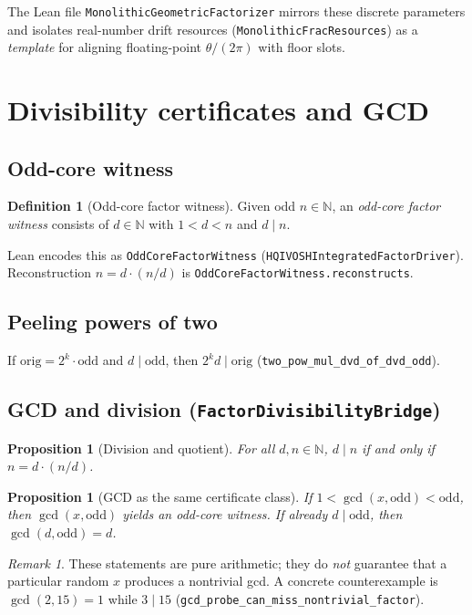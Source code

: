 \documentclass[11pt,a4paper]{article}
\newcommand{\N}{\mathbb{N}}
\theoremstyle{plain}
\newtheorem{proposition}[theorem]{Proposition}
\theoremstyle{definition}
\newtheorem{definition}[theorem]{Definition}
\theoremstyle{remark}
\newtheorem{remark}[theorem]{Remark}
\begin{document}
The Lean file \texttt{MonolithicGeometricFactorizer} mirrors these discrete parameters
and isolates real-number drift resources (\texttt{MonolithicFracResources}) as a
\emph{template} for aligning floating-point $\theta/(2\pi)$ with floor slots.

\section{Divisibility certificates and GCD}

\subsection{Odd-core witness}

\begin{definition}[Odd-core factor witness]
Given odd $n\in\N$, an \emph{odd-core factor witness} consists of $d\in\N$ with
$1<d<n$ and $d\mid n$.
\end{definition}

Lean encodes this as \texttt{OddCoreFactorWitness} (\texttt{HQIVOSHIntegratedFactorDriver}).
Reconstruction $n = d\cdot (n/d)$ is \texttt{OddCoreFactorWitness.reconstructs}.

\subsection{Peeling powers of two}

If $\mathrm{orig} = 2^k \cdot \mathrm{odd}$ and $d\mid \mathrm{odd}$, then
$2^k d \mid \mathrm{orig}$ (\texttt{two\_pow\_mul\_dvd\_of\_dvd\_odd}).

\subsection{GCD and division (\texttt{FactorDivisibilityBridge})}

\begin{proposition}[Division and quotient]
For all $d,n\in\N$, $d\mid n$ if and only if $n = d\cdot (n/d)$.
\end{proposition}

\begin{proposition}[GCD as the same certificate class]
If $1 < \gcd(x,\mathrm{odd}) < \mathrm{odd}$, then $\gcd(x,\mathrm{odd})$ yields an
odd-core witness. If already $d\mid \mathrm{odd}$, then $\gcd(d,\mathrm{odd})=d$.
\end{proposition}

\begin{remark}
These statements are pure arithmetic; they do \emph{not} guarantee that a particular
random $x$ produces a nontrivial gcd. A concrete counterexample is
$\gcd(2,15)=1$ while $3\mid 15$ (\texttt{gcd\_probe\_can\_miss\_nontrivial\_factor}).
\end{remark}
\end{document}

